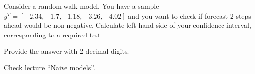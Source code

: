 
\begin{question}
Consider a random walk model. You have a sample \(y^T = [-2.34, -1.7, -1.18, -3.26, -4.02]\) and you want to check if forecast 2 steps ahead would be non-negative. Calculate left hand side of your confidence interval, corresponding to a required test.

Provide the answer with 2 decimal digits.
\end{question}

\begin{solution}
Check lecture ``Naive models''.
\end{solution}

